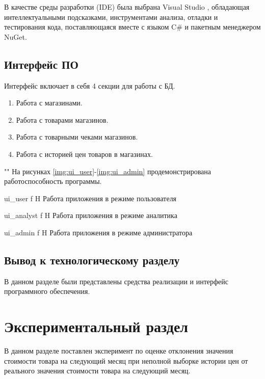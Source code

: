 \documentclass{bmstu}
\begin{document}
В качестве среды разработки (IDE) была выбрана Visual Studio \cite{vs}, обладающая интеллектуальными подсказками, инструментами анализа, отладки и тестирования кода, поставляющаяся вместе с языком C\# и пакетным менеджером NuGet.

\section{Интерфейс ПО}

Интерфейс включает в себя 4 секции для работы с БД.

\begin{enumerate}
	\setlength\itemsep{0.01em}
	\item Работа с магазинами.
	\item Работа с товарами магазинов.
	\item Работа с товарными чеками магазинов.
	\item Работа с историей цен товаров в магазинах.
\end{enumerate}

""\newline\indent
На рисунках \ref{img:ui_user}-\ref{img:ui_admin} продемонстрирована работоспособность программы.


	{ui_user}
	{f}
	{H}
	{\textwidth}
	{Работа приложения в режиме пользователя}

	{ui_analyst}
	{f}
	{H}
	{\textwidth}
	{Работа приложения в режиме аналитика}

	{ui_admin}
	{f}
	{H}
	{\textwidth}
	{Работа приложения в режиме администратора}

\section*{Вывод к технологическому разделу}

В данном разделе были представлены средства реализации и интерфейс программного обеспечения.

\chapter{Экспериментальный раздел}

В данном разделе поставлен эксперимент по оценке отклонения значения стоимости товара на следующий месяц при неполной выборке истории цен от реального значения стоимости товара на следующий месяц.
\end{document}

